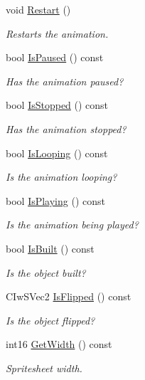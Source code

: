\begin{DoxyCompactItemize}
void \hyperlink{class_c_ty_sprite_aee105391eb1fe58a9811202ecdc6f842}{Restart} ()
\begin{DoxyCompactList}\small\item\em Restarts the animation. \end{DoxyCompactList}\item 
bool \hyperlink{class_c_ty_sprite_a7fa1acf3af5445c249d3adb6f8dc4842}{IsPaused} () const 
\begin{DoxyCompactList}\small\item\em Has the animation paused? \end{DoxyCompactList}\item 
bool \hyperlink{class_c_ty_sprite_ad92a279af844a5ffaaa361dfe7ed3e23}{IsStopped} () const 
\begin{DoxyCompactList}\small\item\em Has the animation stopped? \end{DoxyCompactList}\item 
bool \hyperlink{class_c_ty_sprite_af02c13028b55b6d74c3462b0a281f478}{IsLooping} () const 
\begin{DoxyCompactList}\small\item\em Is the animation looping? \end{DoxyCompactList}\item 
bool \hyperlink{class_c_ty_sprite_a9ff2cf53bb8905fc5f8e24e913e24ce0}{IsPlaying} () const 
\begin{DoxyCompactList}\small\item\em Is the animation being played? \end{DoxyCompactList}\item 
bool \hyperlink{class_c_ty_sprite_a15c3c0cb64a13a18e24c0ae5f1fdaa12}{IsBuilt} () const 
\begin{DoxyCompactList}\small\item\em Is the object built? \end{DoxyCompactList}\item 
CIwSVec2 \hyperlink{class_c_ty_sprite_a19185855d525be5efcd832fdf7e8933b}{IsFlipped} () const 
\begin{DoxyCompactList}\small\item\em Is the object flipped? \end{DoxyCompactList}\item 
int16 \hyperlink{class_c_ty_sprite_a41d4c27208778c8fe866f1d62fc7e2f1}{GetWidth} () const 
\begin{DoxyCompactList}\small\item\em Spritesheet width. \end{DoxyCompactList}\item 

\end{DoxyCompactItemize}
